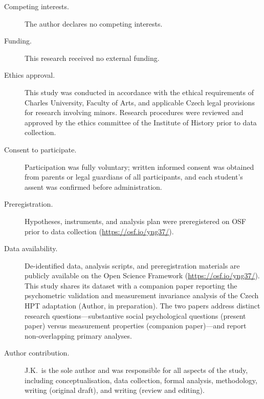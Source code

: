 \documentclass[12pt]{article}
\begin{document}
\begin{description}
\item[Competing interests.] The author declares no competing interests.

\item[Funding.] This research received no external funding.

\item[Ethics approval.] This study was conducted in accordance with the ethical requirements of Charles University, Faculty of Arts, and applicable Czech legal provisions for research involving minors. Research procedures were reviewed and approved by the ethics committee of the Institute of History prior to data collection.

\item[Consent to participate.] Participation was fully voluntary; written informed consent was obtained from parents or legal guardians of all participants, and each student's assent was confirmed before administration.

\item[Preregistration.] Hypotheses, instruments, and analysis plan were preregistered on OSF prior to data collection (\url{https://osf.io/yng37/}).

\item[Data availability.] De-identified data, analysis scripts, and preregistration materials are publicly available on the Open Science Framework (\url{https://osf.io/yng37/}). This study shares its dataset with a companion paper reporting the psychometric validation and measurement invariance analysis of the Czech HPT adaptation (Author, in preparation). The two papers address distinct research questions---substantive social psychological questions (present paper) versus measurement properties (companion paper)---and report non-overlapping primary analyses.

\item[Author contribution.] J.K.\ is the sole author and was responsible for all aspects of the study, including conceptualisation, data collection, formal analysis, methodology, writing (original draft), and writing (review and editing).
\end{description}
\end{document}
